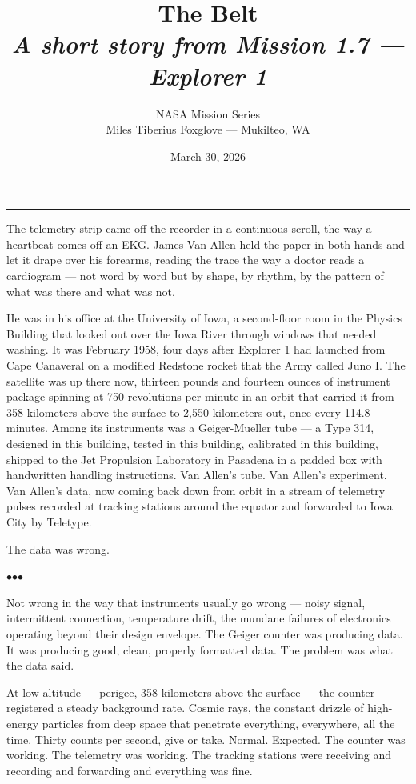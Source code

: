 \documentclass[12pt, letterpaper]{article}
\title{\Huge\textbf{The Belt}\\[0.5em]\large\textit{A short story from Mission 1.7 --- Explorer 1}}
\author{NASA Mission Series\\[0.3em]\small Miles Tiberius Foxglove --- Mukilteo, WA}
\date{March 30, 2026}
\begin{document}
\maketitle
\thispagestyle{empty}

\vspace{1em}
\noindent\rule{\textwidth}{0.4pt}
\vspace{1em}

\noindent The telemetry strip came off the recorder in a continuous scroll, the way a heartbeat comes off an EKG. James Van Allen held the paper in both hands and let it drape over his forearms, reading the trace the way a doctor reads a cardiogram --- not word by word but by shape, by rhythm, by the pattern of what was there and what was not.

He was in his office at the University of Iowa, a second-floor room in the Physics Building that looked out over the Iowa River through windows that needed washing. It was February 1958, four days after Explorer 1 had launched from Cape Canaveral on a modified Redstone rocket that the Army called Juno I. The satellite was up there now, thirteen pounds and fourteen ounces of instrument package spinning at 750 revolutions per minute in an orbit that carried it from 358 kilometers above the surface to 2,550 kilometers out, once every 114.8 minutes. Among its instruments was a Geiger-Mueller tube --- a Type 314, designed in this building, tested in this building, calibrated in this building, shipped to the Jet Propulsion Laboratory in Pasadena in a padded box with handwritten handling instructions. Van Allen's tube. Van Allen's experiment. Van Allen's data, now coming back down from orbit in a stream of telemetry pulses recorded at tracking stations around the equator and forwarded to Iowa City by Teletype.

The data was wrong.

\bigskip
\centerline{$\bullet$\quad$\bullet$\quad$\bullet$}
\bigskip

Not wrong in the way that instruments usually go wrong --- noisy signal, intermittent connection, temperature drift, the mundane failures of electronics operating beyond their design envelope. The Geiger counter was producing data. It was producing good, clean, properly formatted data. The problem was what the data said.

At low altitude --- perigee, 358 kilometers above the surface --- the counter registered a steady background rate. Cosmic rays, the constant drizzle of high-energy particles from deep space that penetrate everything, everywhere, all the time. Thirty counts per second, give or take. Normal. Expected. The counter was working. The telemetry was working. The tracking stations were receiving and recording and forwarding and everything was fine.
\end{document}
